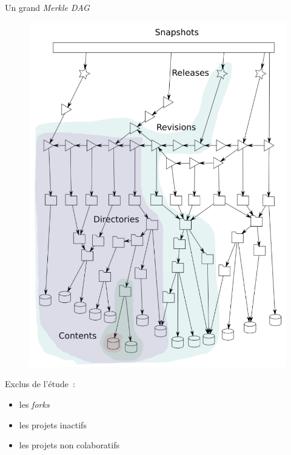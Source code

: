 \documentclass[usenames,dvipsnames,10pt]{beamer}
\newcommand{\mycite}[1]{%
    \citeauthor{#1} \citeyear{#1} \cite{#1}%
}
\begin{document}
\begin{frame}{Un grand \emph{Merkle DAG}}
    \begin{minipage}{.46\textwidth}
        \begin{figure}
            \includegraphics[width=\textwidth]{swh-graph}
        \end{figure}

        \mycite{swh-2019}
    \end{minipage}
    \begin{minipage}{.52\textwidth}
        Exclus de l'étude : \begin{itemize}
            \item les \emph{forks}
            \item les projets inactifs
            \item les projets non colaboratifs
        \end{itemize}

        \bigskip


\end{minipage}
\end{frame}
\end{document}

